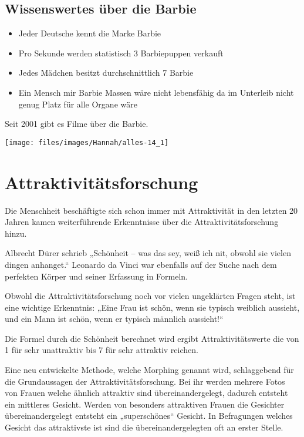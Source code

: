 \subsection{Wissenswertes über die Barbie}
\begin{itemize}
	\item Jeder Deutsche kennt die Marke Barbie
	\item Pro Sekunde werden statistisch 3 Barbiepuppen verkauft
	\item Jedes Mädchen besitzt durchschnittlich 7 Barbie
	\item Ein Mensch mir Barbie Massen wäre nicht lebensfähig da im Unterleib nicht genug Platz
		für alle Organe wäre
\end{itemize}

Seit 2001 gibt es Filme über die Barbie.

\begin{figurewrapper}
	\texttt{[image: files/images/Hannah/alles-14\_1]}%
\end{figurewrapper}

\section{Attraktivitätsforschung}
Die Menschheit beschäftigte sich schon immer mit Attraktivität in den letzten 20 Jahren kamen
weiterführende Erkenntnisse über die Attraktivitätsforschung hinzu.

Albrecht Dürer schrieb „Schönheit -- was das sey, weiß ich nit, obwohl sie vielen dingen anhanget.“
Leonardo da Vinci war ebenfalls auf der Suche nach dem perfekten Körper und seiner Erfassung in
Formeln.

Obwohl die Attraktivitätsforschung noch vor vielen ungeklärten Fragen steht, ist eine wichtige
Erkenntnis: „Eine Frau ist schön, wenn sie typisch weiblich aussieht, und ein Mann ist schön, wenn er
typisch männlich aussieht!“

Die Formel durch die Schönheit berechnet wird ergibt Attraktivitätswerte die von 1 für sehr
unattraktiv bis 7 für sehr attraktiv reichen.

Eine neu entwickelte Methode, welche Morphing genannt wird, schlaggebend für die Grundaussagen der
Attraktivitätsforschung. Bei ihr werden mehrere Fotos von Frauen welche ähnlich attraktiv sind
übereinandergelegt, dadurch entsteht ein mittleres Gesicht. Werden von besonders attraktiven Frauen
die Gesichter übereinandergelegt entsteht ein „superschönes“ Gesicht. In Befragungen welches Gesicht
das attraktivste ist sind die übereinandergelegten oft an erster Stelle.

